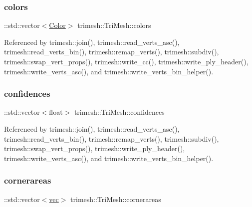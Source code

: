 \subsubsection{\texorpdfstring{colors}{colors}}
{\footnotesize\ttfamily \+::std\+::vector$<$\hyperlink{classtrimesh_1_1Color}{Color}$>$ trimesh\+::\+Tri\+Mesh\+::colors}



Referenced by trimesh\+::join(), trimesh\+::read\+\_\+verts\+\_\+asc(), trimesh\+::read\+\_\+verts\+\_\+bin(), trimesh\+::remap\+\_\+verts(), trimesh\+::subdiv(), trimesh\+::swap\+\_\+vert\+\_\+props(), trimesh\+::write\+\_\+cc(), trimesh\+::write\+\_\+ply\+\_\+header(), trimesh\+::write\+\_\+verts\+\_\+asc(), and trimesh\+::write\+\_\+verts\+\_\+bin\+\_\+helper().

\mbox{\label{classtrimesh_1_1TriMesh_a6ab73ed06ae381db8442a821b5387c91}} 
\subsubsection{\texorpdfstring{confidences}{confidences}}
{\footnotesize\ttfamily \+::std\+::vector$<$float$>$ trimesh\+::\+Tri\+Mesh\+::confidences}



Referenced by trimesh\+::join(), trimesh\+::read\+\_\+verts\+\_\+asc(), trimesh\+::read\+\_\+verts\+\_\+bin(), trimesh\+::remap\+\_\+verts(), trimesh\+::subdiv(), trimesh\+::swap\+\_\+vert\+\_\+props(), trimesh\+::write\+\_\+ply\+\_\+header(), trimesh\+::write\+\_\+verts\+\_\+asc(), and trimesh\+::write\+\_\+verts\+\_\+bin\+\_\+helper().

\mbox{\label{classtrimesh_1_1TriMesh_a1c9eaa0f6a4e98c7c9fe2a4cd81f319b}} 
\subsubsection{\texorpdfstring{cornerareas}{cornerareas}}
{\footnotesize\ttfamily \+::std\+::vector$<$\hyperlink{namespacetrimesh_a4fc2b83feba99c931f837a0c7d4b4df1}{vec}$>$ trimesh\+::\+Tri\+Mesh\+::cornerareas}



